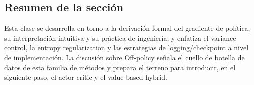 \subsection{Resumen de la sección}
Esta clase se desarrolla en torno a la derivación formal del gradiente de política, su interpretación intuitiva y su práctica de ingeniería, y enfatiza el variance control, la entropy regularization y las estrategias de logging/checkpoint a nivel de implementación. La discusión sobre Off-policy señala el cuello de botella de datos de esta familia de métodos y prepara el terreno para introducir, en el siguiente paso, el actor-critic y el value-based hybrid.


